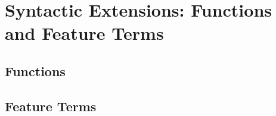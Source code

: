 
\section{Syntactic Extensions: Functions and Feature Terms}


\subsection{Functions}


\subsection{Feature Terms}

